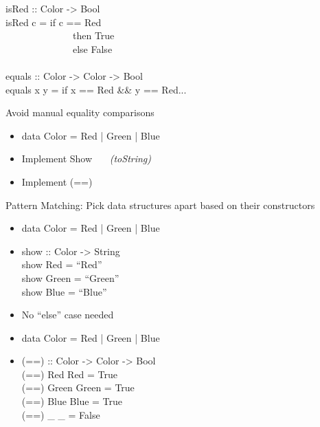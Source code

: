 \documentclass{beamer}                  %
\newcommand{\srule}{
	\rule{\textwidth}{1pt}\\
}
\newlength{\subsecwidth}
\newenvironment{slide}{
	\begin{frame} %
	\settowidth{\subsecwidth}{\insertsubsection} %
	\ifthenelse{\dimtest{\subsecwidth}{<}{1pt}}{ %
		\frametitle{\insertsection\\             %
		\vspace{-1ex}                            %
		\color{fore}\srule                       %
		\par                                     %
		\vspace{-3ex}                            %
		}
	}{                                           %
		\frametitle{\insertsection\ -- \insertsubsection\\ %
		\vspace{-1ex}                            %
		\color{fore}\srule                       %
		\par                                     %
		\vspace{-3ex}                            %
		}
	}
	\Large                                       %
}{
	\end{frame}
}
\begin{document}
\begin{slide}
  isRed :: Color -> Bool\\
  isRed c = if c == Red\\
  ~~~~~~~~~~~~~~then True\\
  ~~~~~~~~~~~~~~else False\\
  \mbox{}\\
  equals :: Color -> Color -> Bool\\
  equals x y = if x == Red \&\& y == Red...
\end{slide}

\begin{slide}
  Avoid manual equality comparisons
  \begin{itemize}
    \item data Color = Red | Green | Blue
    \item Implement Show ~~~\textit{(toString)}
    \item Implement (==)
  \end{itemize}
\end{slide}

\begin{slide}
  Pattern Matching: Pick data structures apart based on their constructors
  \begin{itemize}
    \item data Color = Red | Green | Blue
      \item
        show :: Color -> String\\
        show Red = ``Red''\\
        show Green = ``Green''\\
        show Blue = ``Blue''
      \item No ``else'' case needed
  \end{itemize}
\end{slide}

\begin{slide}
  \begin{itemize}
    \item data Color = Red | Green | Blue
    \item
        (==) :: Color -> Color -> Bool\\
        (==) Red Red     = True\\
        (==) Green Green = True\\
        (==) Blue Blue   = True\\
        (==) \_ \_         = False
  \end{itemize}
\end{slide}
\end{document}
